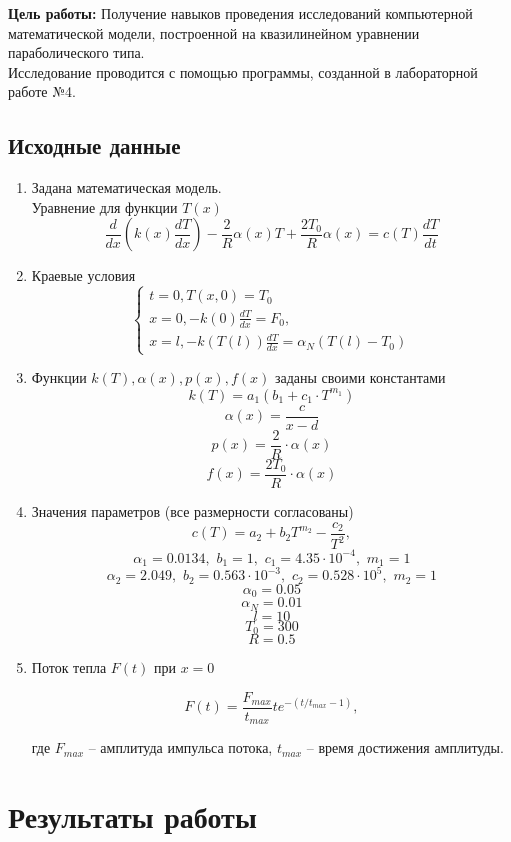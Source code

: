 \documentclass[a4paper, 14pt]{article}
\begin{document}
	\textbf{Цель работы:} Получение навыков проведения исследований компьютерной математической модели, построенной на квазилинейном уравнении параболического типа. \\
	
	Исследование проводится  с помощью программы, созданной   в лабораторной работе №4. 
	
	
	\subsection*{Исходные данные}
	
\begin{enumerate}
\item Задана математическая модель.\\
Уравнение для функции $T(x)$
$$\frac{d}{dx}(k(x) \frac{dT}{dx}) - \frac{2}{R}\alpha(x)T + \frac{2T_0}{R} \alpha(x) = c(T) \frac{dT}{dt}$$
\item Краевые условия 
$$\begin{cases}
t = 0, T(x,0) = T_0
\\
x = 0,  -k(0)\frac{dT}{dx} = F_0,
\\
x = l,  -k(T(l))\frac{dT}{dx} = \alpha_N(T(l) - T_0)
\end{cases}$$
\item Функции  $k(T), \alpha(x), p(x), f(x)$ заданы своими константами
$$k(T) = a_1(b_1+c_1 \cdot T^{m_1})$$
$$\alpha(x) = \frac{c}{x-d}$$
$$p(x) = \frac{2}{R} \cdot \alpha(x)$$
$$f(x) = \frac{2T_0}{R} \cdot \alpha(x)$$
\item Значения параметров (все размерности согласованы)
$$c(T) = a_2 + b_2T^{m_2} - \frac{c_2}{T^2},$$
$$\alpha_1 = 0.0134, \,\, b_1 = 1,\,\, c_1= 4.35 \cdot 10^{-4},\,\, m_1 = 1$$
$$\alpha_2 = 2.049,\,\, b_2 = 0.563\cdot 10^{-3},\,\, c_2= 0.528 \cdot 10^{5}, \,\,m_2 = 1$$
$$\alpha_0 = 0.05$$
$$\alpha_N = 0.01$$
$$l = 10$$
$$T_0 = 300$$
$$R = 0.5 $$
\item Поток тепла $F(t)$ при $x=0$

$$F(t) = \frac{F_{max}}{t_{max}} t e^{- (t/t_{max} - 1)},$$

где $F_{max}$ -- амплитуда импульса потока, $t_{max}$ -- время достижения амплитуды.
\end{enumerate}


\section*{Результаты работы}
\end{document}
